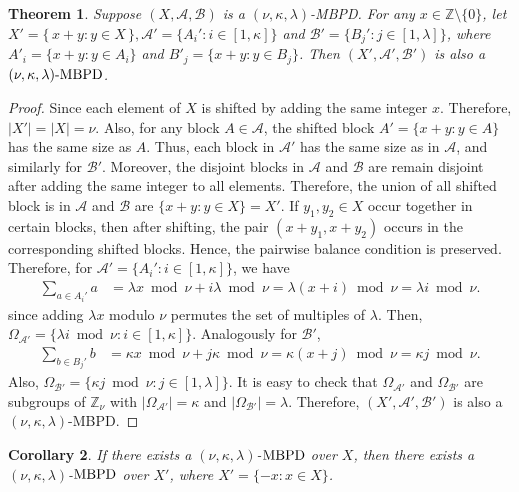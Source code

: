 \documentclass[preprint,11pt]{elsarticle}
\newcommand{\MBPD}{\textnormal{MBPD}}
\newtheorem{theorem}{Theorem}[section]
\newtheorem{corollary}[theorem]{Corollary}
\begin{document}
\begin{theorem}
Suppose $(X, \mathcal{A}, \mathcal{B})$ is a $(\nu,\kappa,\lambda)$-\MBPD.  
For any $x\in \mathbb{Z}\setminus\{0\}$, let $X' = \{\,x+y : y\in X\,\}, \mathcal{A}' =\{A_i': i \in [1, \kappa]\}$ and
$\mathcal{B}' = \{B_j': j \in [1, \lambda]\}$, where  $A'_i = \{x+y : y\in A_i\}$ and  $B'_j = \{x+y : y\in B_j\}$. Then $(X', \mathcal{A}', \mathcal{B}')$ is also a $(\nu,\kappa,\lambda)\text{-}\MBPD$.
\end{theorem}

\begin{proof}Since each element of $X$ is shifted by adding the same integer $x$.  Therefore, 
\(
|X'| = |X| = \nu.
\)
Also, 
for any block $A\in \mathcal{A}$, the shifted block $A'=\{x+y : y\in A\}$ has the same size as $A$.  
Thus, each block in $\mathcal{A}'$ has the same size as in $\mathcal{A}$, and similarly for $\mathcal{B}'$. Moreover, the
disjoint blocks in $\mathcal{A}$ and $\mathcal{B}$ are remain disjoint after adding the same integer to all elements. Therefore, 
the union of all shifted block is in $\mathcal{A}$ and $\mathcal{B}$ are $\{x+y : y\in X\} = X'$. 
If $y_1,y_2\in X$ occur together in certain blocks, then after shifting, the pair $(x+y_1, x+y_2)$ occurs in the corresponding shifted blocks.  
Hence, the pairwise balance condition is preserved. Therefore, for $\mathcal{A}'=\{A_i': i \in [1, \kappa]\}$, we have \begin{align*}
    \sum_{a\in A_{i}'}a & = \lambda x \bmod{\nu}+i\lambda \bmod{\nu}=\lambda(x+i)\bmod{\nu} =\lambda i \bmod \nu.
\end{align*}
since adding $\lambda x$ modulo $\nu$ permutes the set of multiples of $\lambda$. Then, $\Omega_{\mathcal{A}'}=\{\lambda i \bmod \nu: i \in [1, \kappa]\}$. 
Analogously for $\mathcal{B}'$,  \begin{align*}
    \sum_{b\in B_{j}'}b & = \kappa x \bmod{\nu}+j\kappa \bmod{\nu}=\kappa(x+j)\bmod{\nu} = \kappa j\bmod{\nu}.
\end{align*}
Also, $\Omega_{\mathcal{B}'}=\{\kappa j\bmod{\nu}: j \in [1, \lambda]\}$. It is easy to check that $\Omega_{\mathcal{A}'}$ and $\Omega_{\mathcal{B}'}$ are subgroups of $\mathbb{Z}_{\nu}$ with
$|\Omega_{\mathcal{A}'}|=\kappa$ and $|\Omega_{\mathcal{B}'}|=\lambda$.
Therefore,  $(X', \mathcal{A}', \mathcal{B}')$ is also a $(\nu,\kappa,\lambda)$-MBPD.
\end{proof}
\begin{corollary}
    If there exists a $(\nu, \kappa, \lambda)$-$\MBPD$ over $X$, then there exists a  $(\nu, \kappa, \lambda)$-$\MBPD$ over $X'$, where $X'=\{-x: x\in X\}$.
\end{corollary}
\end{document}
